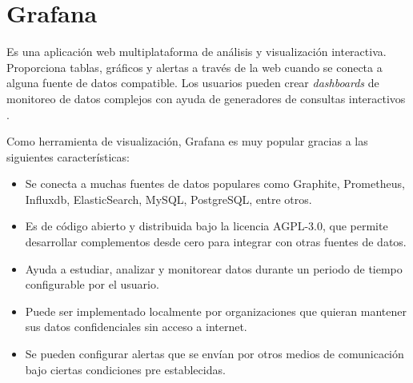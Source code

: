 \section{Grafana}
Es una aplicación web multiplataforma de análisis y visualización interactiva. Proporciona tablas, gráficos y alertas a través de la web cuando se conecta a alguna fuente de datos compatible. Los usuarios pueden crear \textit{dashboards} de monitoreo de datos complejos con ayuda de generadores de consultas interactivos \cite{grafana_info}.

Como herramienta de visualización, Grafana es muy popular gracias a las siguientes características:
\begin{itemize}
	\item Se conecta a muchas fuentes de datos populares como Graphite, Prometheus, Influxdb, ElasticSearch, MySQL, PostgreSQL, entre otros.
	\item Es de código abierto y distribuida bajo la licencia  AGPL-3.0, que permite desarrollar complementos desde cero para integrar con otras fuentes de datos.
	\item Ayuda a estudiar, analizar y monitorear datos durante un periodo de tiempo configurable por el usuario.
	\item Puede ser implementado localmente por organizaciones que quieran mantener sus datos confidenciales sin acceso a internet.
	\item Se pueden configurar alertas que se envían por otros medios de comunicación bajo ciertas condiciones pre establecidas.
\end{itemize}




